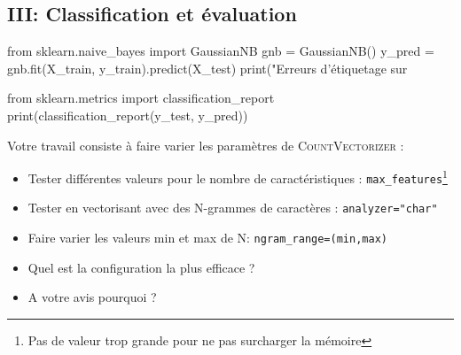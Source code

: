 \subsection*{III: Classification et évaluation}

\begin{python}
from sklearn.naive_bayes import GaussianNB
gnb = GaussianNB()
y_pred = gnb.fit(X_train, y_train).predict(X_test)
print("Erreurs d'étiquetage sur %

from sklearn.metrics import classification_report
print(classification_report(y_test, y_pred))
\end{python}

Votre travail consiste à faire varier les paramètres de \textsc{CountVectorizer} :
\begin{itemize}
  \item Tester différentes valeurs pour le nombre de caractéristiques : \texttt{max\_features}\footnote{Pas de valeur trop grande pour ne pas surcharger la mémoire}
  \item Tester en vectorisant avec des N-grammes de caractères : \texttt{analyzer="char"}
  \item Faire varier les valeurs min et max de N:  \texttt{ngram\_range=(min,max)}
  \item Quel est la configuration la plus efficace ?
  \item A votre avis pourquoi ?
\end{itemize}
